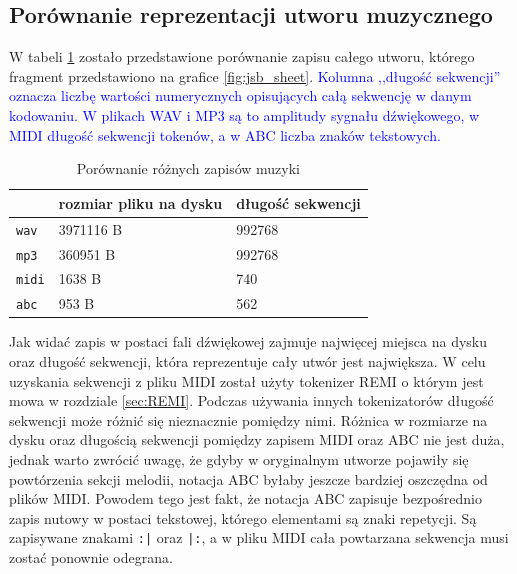 \documentclass[data-science]{agh-wi} %
\begin{document}
\subsection{Porównanie reprezentacji utworu muzycznego}
W tabeli \ref*{tab:music_diff} zostało przedstawione porównanie zapisu całego utworu, którego fragment przedstawiono na grafice \ref*{fig:jsb_sheet}. \textcolor{blue}{Kolumna ,,długość sekwencji'' oznacza liczbę wartości numerycznych opisujących całą sekwencję w danym kodowaniu. W plikach WAV i MP3 są to amplitudy sygnału dźwiękowego, w MIDI długość sekwencji tokenów, a w ABC liczba znaków tekstowych.}

\begin{table}[ht!]
    \centering
    \begin{tabular}{|l|l|l|}
        \hline
                      & rozmiar pliku na dysku & długość sekwencji \\ \hline
        \texttt{wav}  & 3971116 B              & 992768            \\ \hline
        \texttt{mp3}  & 360951 B               & 992768            \\ \hline
        \texttt{midi} & 1638 B                 & 740               \\ \hline
        \texttt{abc}  & 953 B                  & 562               \\ \hline
    \end{tabular}
    \caption{Porównanie różnych zapisów muzyki}\label{tab:music_diff}
\end{table}

Jak widać zapis w postaci fali dźwiękowej zajmuje najwięcej miejsca na dysku oraz długość sekwencji, która reprezentuje cały utwór jest największa. W celu uzyskania sekwencji z pliku MIDI został użyty tokenizer REMI o którym jest mowa w rozdziale \ref*{sec:REMI}. Podczas używania innych tokenizatorów długość sekwencji może różnić się nieznacznie pomiędzy nimi. Różnica w rozmiarze na dysku oraz długością sekwencji pomiędzy zapisem MIDI oraz ABC nie jest duża, jednak warto zwrócić uwagę, że gdyby w oryginalnym utworze pojawiły się powtórzenia sekcji melodii, notacja ABC byłaby jeszcze bardziej oszczędna od plików MIDI. Powodem tego jest fakt, że notacja ABC zapisuje bezpośrednio zapis nutowy w postaci tekstowej, którego elementami są znaki repetycji. Są zapisywane znakami \texttt{:|} oraz \texttt{|:}, a w pliku MIDI cała powtarzana sekwencja musi zostać ponownie odegrana.
\end{document}
